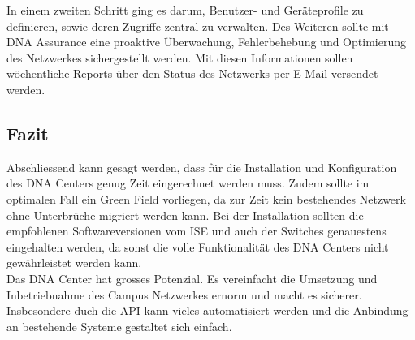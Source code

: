 In einem zweiten Schritt ging es darum, Benutzer- und Geräteprofile zu definieren, sowie deren Zugriffe zentral zu verwalten. Des Weiteren sollte mit DNA Assurance eine proaktive Überwachung, Fehlerbehebung und Optimierung des Netzwerkes sichergestellt werden. Mit diesen Informationen sollen wöchentliche Reports über den Status des Netzwerks per E-Mail versendet werden.

\subsection{Fazit}
Abschliessend kann gesagt werden, dass für die Installation und Konfiguration des DNA Centers genug Zeit eingerechnet werden muss. Zudem sollte im optimalen Fall ein Green Field vorliegen, da zur Zeit kein bestehendes Netzwerk ohne Unterbrüche migriert werden kann. Bei der Installation sollten die empfohlenen Softwareversionen vom ISE und auch der Switches genauestens eingehalten werden, da sonst die volle Funktionalität des DNA Centers nicht gewährleistet werden kann. \\
Das DNA Center hat grosses Potenzial. Es vereinfacht die Umsetzung und Inbetriebnahme des Campus Netzwerkes ernorm und macht es sicherer. Insbesondere duch die API kann vieles automatisiert werden und die Anbindung an bestehende Systeme gestaltet sich einfach.